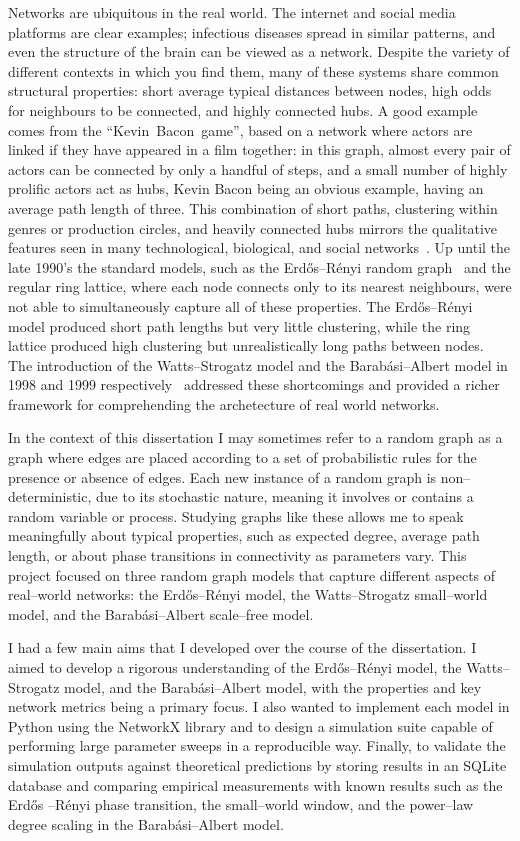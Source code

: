 \documentclass[12pt, a4paper]{report}
\theoremstyle{definition}
\theoremstyle{plain}
\theoremstyle{remark}
\begin{document}
Networks are ubiquitous in the real world. The internet and social media
platforms are clear examples; infectious diseases spread in similar
patterns, and even the structure of the brain can be viewed as a network.
Despite the variety of different contexts in which you find them, many of
these systems share common structural properties: short average typical
distances between nodes, high odds for neighbours to be connected, and
highly connected hubs. A good example comes from the “Kevin~Bacon~game”,
based on a network where actors are linked if they have appeared in a film
together: in this graph, almost every pair of actors can be connected by only
a handful of steps, and a small number of highly prolific actors act as hubs,
Kevin Bacon being an obvious example, having an average path length of three.
This combination of short paths, clustering within genres or production
circles, and heavily connected hubs mirrors the qualitative features seen
in many technological, biological, and social networks~\cite{baconbible1999}.
Up until the late 1990's the standard models, such as the Erd\H{o}s--R\'enyi
random graph~\cite{erdos1959} and the regular ring lattice, where each
node connects only to its nearest neighbours, were not able to simultaneously
capture all of these properties. The Erd\H{o}s--R\'enyi model produced short
path lengths but very little clustering, while the ring lattice produced
high clustering but unrealistically long paths between nodes. The
introduction of the Watts--Strogatz model and the Barab\'asi--Albert
model in 1998 and 1999 respectively~\cite{watts1998, barabasi1999}
addressed these shortcomings and provided a richer framework for
comprehending the archetecture of real world networks.

In the context of this dissertation I may sometimes refer to a random graph as a 
graph where
edges are placed according to a set of probabilistic rules for the
presence or absence of edges. Each new instance of a random graph is
non--deterministic, due to its stochastic nature, meaning it involves
or contains a random variable or process. Studying graphs like these allows
me to speak meaningfully about typical properties, such as expected 
degree, average path length, or about phase transitions in connectivity
as parameters vary. This project focused on three random graph models
that capture different aspects of real--world networks: the
Erd\H{o}s--R\'enyi model, the Watts--Strogatz small--world model,
and the Barab\'asi--Albert scale--free model.

I had a few main aims that I developed over the course of the
dissertation. I aimed to develop a rigorous understanding of
the Erd\H{o}s--R\'enyi model, the Watts--Strogatz model,
and the Barab\'asi--Albert model, with the properties and key network
metrics being a primary focus. I also wanted to implement each model in
Python using the NetworkX library and to design a simulation suite
capable of performing large parameter sweeps in a reproducible way.
Finally, to validate the simulation outputs against theoretical
predictions by storing results in an SQLite database and comparing
empirical measurements with known results such as the Erd\H{o}s
--R\'enyi phase transition, the small--world window, and the
power--law degree scaling in the Barab\'asi--Albert model.
\end{document}
